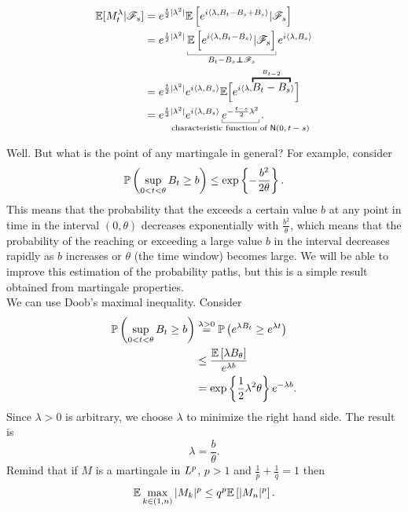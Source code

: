 \documentclass[12pt]{report}
\begin{document}
\begin{fancyproof}
\begin{enumerate}
	\begin{align*}
		\evs[M_{t}^{\lambda}|\F_{s}]&=e^{\frac{t}{2}|\lambda^{2}|}\evs\left[e^{i\inprod{\lambda,B_{t}-B_{s}+B_{s}}}|\F_{s}\right]\\
		&=e^{\frac{t}{2}|\lambda^{2}|}\ubracketthin{\evs\left[e^{i\inprod{\lambda, B_{t}-B_{s}}}|\F_{s}\right]}_{B_{t}-B_{s}\independent\F_{s}}e^{i\inprod{\lambda, B_{s}}}\\
		&=e^{\frac{t}{2}|\lambda^{2}|}e^{i\inprod{\lambda, B_{s}}}\evs\Bigl[e^{i\inprod{\lambda,\overbracket{B_{t}-B_{s}}^{B_{t-2}}}}\Bigr]\\
		&=e^{\frac{t}{2}|\lambda^{2}|}e^{i\inprod{\lambda,B_{s}}}\ubracketthin{e^{-\frac{t-s}{2}\lambda^{2}}}_{\claptext{characteristic function of $\mathsf{N}(0,t-s)$}}.
	\end{align*}
\end{enumerate}
\end{fancyproof}
Well. But what is the point of any martingale in general? For example, consider
\begin{equation*}
	\mathbb{P}\left(\sup_{0<t<\theta}B_{t}\geq b\right)\leq\exp\left\{-\frac{b^{2}}{2\theta}\right\}.
\end{equation*}
This means that the probability that the \bwm{} exceeds a certain value $b$ at any point in time in the interval $(0,\theta)$ decreases exponentially with $\frac{b^{2}}{\theta}$, which means that the probability of the \bwm{} reaching or exceeding a large value $b$ in the interval decreases rapidly as $b$ increases or $\theta$ (the time window) becomes large. We will be able to improve this estimation of the probability paths, but this is a simple result obtained from martingale properties.\\
We can use Doob's maximal inequality. Consider
\begin{align*}
	\mathbb{P}\left(\sup_{0<t<\theta}B_{t}\geq b\right)&\stackrel{\lambda>0}{=}\mathbb{P}\left(e^{\lambda B_{t}}\geq e^{\lambda t}\right)\\
	&\leq\frac{\mathbb{E}\left[\lambda B_{\theta}\right]}{e^{\lambda b}}\\
	&=\exp\left\{\frac{1}{2}\lambda^{2}\theta\right\}e^{-\lambda b}.
\end{align*}
Since $\lambda>0$ is arbitrary, we choose $\lambda$ to minimize the right hand side. The result is 
\begin{equation*}
	\lambda=\frac{b}{\theta}.
\end{equation*}
Remind that if $M$ is a martingale in $L^{p}$, $p>1$ and $\frac{1}{p}+\frac{1}{q}=1$ then
\begin{equation*}
	\mathbb{E}\max_{k\in(1,n)}|M_{k}|^{p}\leq q^{p}\mathbb{E}\left[|M_{n}|^{p}\right].
\end{equation*}
\end{document}
